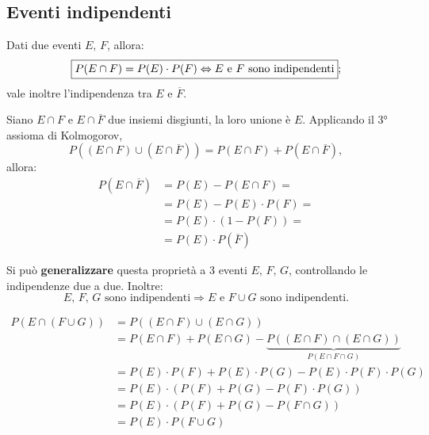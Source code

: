 \subsection{Eventi indipendenti}
Dati due eventi $E, \, F$, allora: \[
\boxed{
P(E \cap F) = P(E) \cdot P(F) \Leftrightarrow \textnormal{$E$ e $F$ sono indipendenti}
};
\]
vale inoltre l'indipendenza tra $E$ e $\overline{F}$.

\begin{dimostrazione}
Siano $E \cap F$ e $E \cap \overline{F}$ due insiemi disgiunti, la loro unione è $E$.
Applicando il 3° assioma di Kolmogorov, \[
P((E \cap F) \cup (E \cap \overline{F}))
    = P(E \cap F) + P(E \cap \overline{F}),
\]
allora:
\begin{align*}
    P(E \cap \overline{F}) &= P(E) - P(E \cap F) = \\
    &= P(E) - P(E) \cdot P(F) = \\
    &= P(E) \cdot (1 - P(F)) = \\
    &= P(E) \cdot P(\overline{F}) \tag*{$\blacksquare$}
\end{align*}

\end{dimostrazione}

\noindent Si può \textbf{generalizzare} questa proprietà a 3 eventi $E,\,F,\,G$, controllando le indipendenze due a due. Inoltre: 
\[
\text{$E,\,F, \,G$ sono indipendenti} \Rightarrow \text{$E$ e $F \cup G$ sono indipendenti}.
\]

\begin{dimostrazione}
\begin{align*}
    P(E \cap (F \cup G)) &= P((E \cap F) \cup (E \cap G)) \tag{distributività} \\
    &= P(E \cap F) + P(E \cap G) - \underbrace{P((E \cap F) \cap (E \cap G))}_{P(E \cap F \cap G)} \tag{$P(E) + P(F) - P(E \cap F$)} \\ 
    &= P(E) \cdot P(F) + P(E) \cdot P(G) - P(E) \cdot P(F) \cdot P(G) \\ 
    &= P(E) \cdot (P(F) + P(G) - P(F) \cdot P(G)) \\ 
    &= P(E) \cdot (P(F) + P(G) - P(F \cap G)) \\ 
    &= P(E) \cdot P(F \cup G) \tag*{$\blacksquare$}
\end{align*}
\end{dimostrazione}

